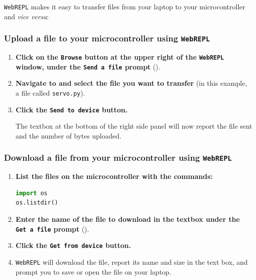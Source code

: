 \texttt{WebREPL} makes it easy to transfer files from your laptop to your microcontroller and \textit{vice versa}: 

\subsubsection{\howto Upload a file to your microcontroller using \texttt{WebREPL}}
\begin{enumerate}
	\item \textbf{Click on the \texttt{Browse} button at the upper right of the \texttt{WebREPL} window, under the \texttt{Send a file} prompt} (). 
	\item \textbf{Navigate to and select the file you want to transfer} (in this example, a file called \texttt{servo.py}).
	\item \textbf{Click the \texttt{Send to device} button.} 
	
	The textbox at the bottom of the right side panel will now report the file sent and the number of bytes uploaded.
\end{enumerate}


\subsubsection{\howto Download a file from your microcontroller using \texttt{WebREPL}}
\begin{enumerate}
	\item \textbf{List the files on the microcontroller with the \Micropython commands:}
\begin{lstlisting}[language=Python]
import os
os.listdir()
\end{lstlisting}
	
	\item \textbf{\textbf{Enter the name of the file to download in the textbox under the \texttt{Get a file} prompt}} ().
	
	
	\item \textbf{Click the \texttt{Get from device} button.} 
	\item \texttt{WebREPL} will download the file, report its name and size in the text box, and prompt you to save or open the file on your laptop.
	\end{enumerate}

